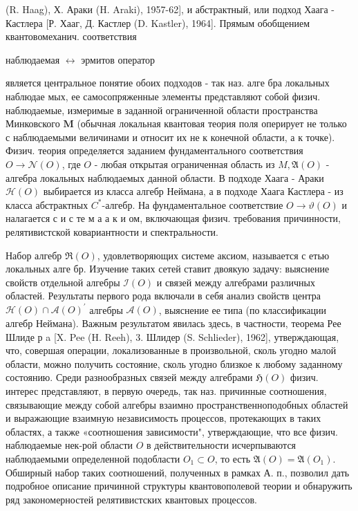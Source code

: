 \documentclass[10pt]{article}
\begin{document}
(R. Haag), Х. Араки (H. Araki), 1957-62], и абстрактный, или подход Хаага - Кастлера [Р. Хааг, Д. Кастлер (D. Kastler), 1964]. Прямым обобщением квантовомеханич. соответствия



наблюдаемая $\leftrightarrow$ эрмитов оператор



является центральное понятие обоих подходов - так наз. алге бра локальных наблюдае мых, ее самосопряженные элементы представляют собой физич. наблюдаемые, измеримые в заданной ограниченной области пространства Минковского $\boldsymbol{M}$ (обычная локальная квантовая теория поля оперирует не только с наблюдаемыми величинами и относит их не к конечной области, а к точке). Физич. теория определяется заданием фундаментального соответствия $O \rightarrow \mathscr{\mathscr { N }}(O)$, где $O$ - любая открытая ограниченная область из $M, \mathfrak{A}(O)$ - алгебра локальных наблюдаемых данной области. В подходе Хаага - Араки $\mathscr{H}(O)$ выбирается из класса алгебр Неймана, а в подходе Хаага Кастлера - из класса абстрактных $C^{*}$-алгебр. На фундаментальное соответствие $O \rightarrow \mathscr{\vartheta}(O)$ и налагается с и с те м а а к и ом, включающая физич. требования причинности, релятивистской ковариантности и спектральности.



Набор алгебр $\mathscr{\Re}(O)$, удовлетворяющих системе аксиом, называется с етью локальных алге бр. Изучение таких сетей ставит двоякую задачу: выяснение свойств отдельной алгебры $\mathscr{I}(O)$ и связей между алгебрами различных областей. Результаты первого рода включали в себя анализ свойств центра $\mathscr{\mathcal { H }}(O) \cap \mathfrak{\mathscr { A }}(O)^{\prime}$ алгебры $\mathfrak{\mathscr { A }}(O)$, выяснение ее типа (по классификации алгебр Неймана). Важным результатом явилась здесь, в частности, теорема Рее Шлиде р a [X. Pee (H. Reeh), 3. Шлидер (S. Schlieder), 1962], утверждающая, что, совершая операции, локализованные в произвольной, сколь угодно малой области, можно получить состояние, сколь угодно близкое к любому заданному состоянию. Среди разнообразных связей между алгебрами $\mathfrak{H}(O)$ физич. интерес представляют, в первую очередь, так наз. причинные соотношения, связывающие между собой алгебры взаимно пространственноподобных областей и выражающие взаимную независимость процессов, протекающих в таких областях, а также «соотношения зависимости", утверждающие, что все физич. наблюдаемые нек-рой области $O$ в действительности исчерпываются наблюдаемыми определенной подобласти $O_{1} \subset O$, то есть $\mathfrak{A}(O)=\mathfrak{A}\left(O_{1}\right)$. Обширный набор таких соотношений, полученных в рамках А. п., позволил дать подробное описание причинной структуры квантовополевой теории и обнаружить ряд закономерностей релятивистских квантовых процессов.
\end{document}
